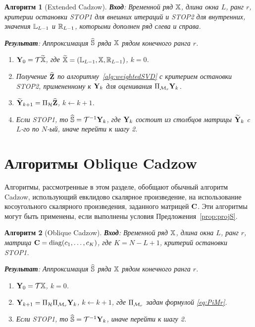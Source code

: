 \documentclass[12pt, specialist, subf,href,colorlinks=true,substylefile = spbu.rtx]{disser}
\newtheorem{algorithm}{Алгоритм}
\theoremstyle{remark}
\theoremstyle{definition}
\begin{document}
\begin{algorithm}[Extended Cadzow] \label{alg:ECIt}
\textbf{Вход}: Временной ряд $\mathbb{X}$, длина окна $L$, ранг $r$,
критерии остановки STOP1 для внешних итераций и STOP2 для внутренних,
значения $\mathbb{L}_{L-1}$ и $\mathbb{R}_{L-1}$, которыми дополнен ряд слева и справа.

\textbf{Результат}:
Аппроксимация $\widehat{\mathbb{S}}$ ряда $\mathbb{X}$ рядом конечного ранга $r$.

\begin{enumerate}
\item
$\mathbf{Y}_0 = \mathcal{T} \widetilde{\mathbb{X}}$, где $\widetilde{\mathbb{X}}=(\mathbb{L}_{L-1}, \mathbb{X}, \mathbb{R}_{L-1})$, $k=0$.
\item
Получение $\widehat{\mathbf{Z}}$ по алгоритму~\ref{alg:weightedSVD} с критерием остановки STOP2, примененному к $\mathbf{Y}_k$ для оценивания $\Pi_{\mathcal{M}_r} \mathbf{Y}_{k}$.
\item
$\widetilde{\mathbf{Y}}_{k+1} = \Pi_{\mathcal{H}}  \widehat{\mathbf{Z}}$, $k\leftarrow k+1$.
\item
Если STOP1, то $\widehat{\mathbb{S}} = \mathcal{T}^{-1} \mathbf{Y}_k$, где $\mathbf{Y}_k$ состоит из столбцов матрицы $\widetilde{\mathbf{Y}}_{k}$
c $L$-го по $N$-ый, иначе перейти к шагу 2.
\end{enumerate}
\end{algorithm}

\section{Алгоритмы Oblique Cadzow}
\label{sec:ObliqueCadzow}
Алгоритмы, рассмотренные в этом разделе, обобщают обычный алгоритм Cadzow, использующий евклидово скалярное произведение, на использование косоугольного скалярного произведения, заданного матрицей $\mathbf{C}$.
Эти алгоритмы могут быть применены, если выполнены условия Предложения~\ref{prop:projS}.

\begin{algorithm}[Oblique Cadzow]
\label{alg:obliqueCadzow}
\textbf{Вход}: Временной ряд $\mathbb{X}$, длина окна $L$, ранг $r$, матрица $\mathbf{C}=\mathop{\mathrm{diag}}(c_1,\ldots, c_K)$, где $K=N-L+1$,
критерий остановки STOP1.

\textbf{Результат}:
Аппроксимация $\widehat{\mathbb{S}}$ ряда $\mathbb{X}$ рядом конечного ранга $r$.

\begin{enumerate}
\item
$\mathbf{Y}_0 = \mathcal{T} \mathbb{X}$, $k=0$.
\item
$\mathbf{Y}_{k+1} = \Pi_{\mathcal{H}}  \Pi_{\mathcal{M}_r} \mathbf{Y}_{k}$, $k\leftarrow k+1$, где
$\Pi_{\mathcal{M}_r}$ задан формулой \eqref{eq:PiMr}.
\item
Если STOP1, то $\widehat{\mathbb{S}} = \mathcal{T}^{-1} \mathbf{Y}_k$, иначе перейти к шагу 2.
\end{enumerate}
\end{algorithm}
\end{document}
